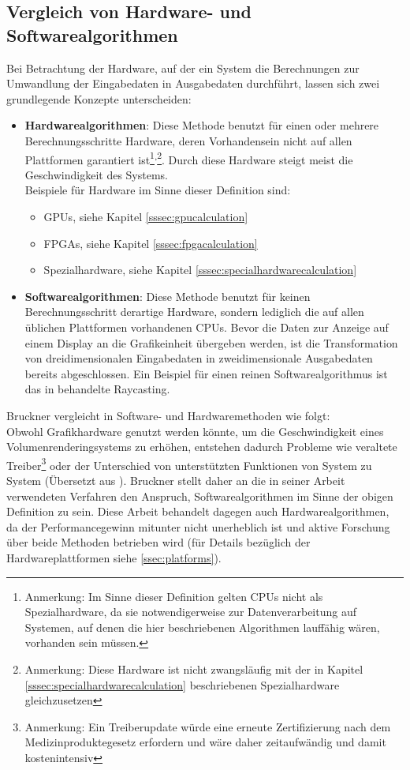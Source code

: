 \documentclass[ngerman,pdftex,paper=A4,DIV=calc,titlepage,12pt]{scrartcl}
\newtheorem[L]{boxedDefinition}{Definition}
\begin{document}
\subsection{Vergleich von Hardware- und Softwarealgorithmen}\label{ssec:swhwcomparison}
Bei Betrachtung der Hardware, auf der ein System die Berechnungen zur Umwandlung der Eingabedaten in Ausgabedaten durchführt, lassen sich zwei grundlegende Konzepte unterscheiden:
\begin{itemize}
 \item \textbf{Hardwarealgorithmen}: Diese Methode benutzt für einen oder mehrere Berechnungsschritte Hardware, deren Vorhandensein nicht auf allen Plattformen garantiert ist\footnote{Anmerkung: Im Sinne dieser Definition gelten CPUs nicht als Spezialhardware, da sie notwendigerweise zur Datenverarbeitung auf Systemen, auf denen die hier beschriebenen Algorithmen lauffähig  wären, vorhanden sein müssen.}\textsuperscript{,}\footnote{Anmerkung: Diese Hardware ist nicht zwangsläufig mit der in Kapitel \ref{sssec:specialhardwarecalculation} beschriebenen Spezialhardware gleichzusetzen}. Durch diese Hardware steigt meist die Geschwindigkeit des Systems.\\
 Beispiele für Hardware im Sinne dieser Definition sind:
 \begin{itemize}
  \item GPUs, siehe Kapitel \vref{sssec:gpucalculation} 
  \item FPGAs, siehe Kapitel \vref{sssec:fpgacalculation}
  \item Spezialhardware, siehe Kapitel \vref{sssec:specialhardwarecalculation}
 \end{itemize}
 \item \textbf{Softwarealgorithmen}: Diese Methode benutzt für keinen Berechnungsschritt derartige Hardware, sondern lediglich die auf allen üblichen Plattformen vorhandenen CPUs. Bevor die Daten zur Anzeige auf einem Display an die Grafikeinheit übergeben werden, ist die Transformation von dreidimensionalen Eingabedaten in zweidimensionale Ausgabedaten bereits abgeschlossen. Ein Beispiel für einen reinen Softwarealgorithmus ist das in \cite{Bruckner2004} behandelte Raycasting.	
\end{itemize}

Bruckner vergleicht in \cite{Bruckner2004} Software- und Hardwaremethoden wie folgt:\\
Obwohl Grafikhardware genutzt werden könnte, um die Geschwindigkeit eines Volumenrenderingsystems zu erhöhen, entstehen dadurch Probleme wie veraltete Treiber\footnote{Anmerkung: Ein Treiberupdate würde eine erneute Zertifizierung nach dem Medizinproduktegesetz erfordern und wäre daher zeitaufwändig und damit kostenintensiv} oder der Unterschied von unterstützten Funktionen von System zu System (Übersetzt aus \cite[Kapitel 3.1.1, Seite 17, Paragraph \glqq Pure Software \grqq]{Bruckner2004}).
Bruckner stellt daher an die in seiner Arbeit verwendeten Verfahren den Anspruch, Softwarealgorithmen im Sinne der obigen Definition zu sein.
Diese Arbeit behandelt dagegen auch Hardwarealgorithmen, da der Performancegewinn mitunter nicht unerheblich ist und aktive Forschung über beide Methoden betrieben wird (für Details bezüglich der Hardwareplattformen siehe \vref{ssec:platforms}).
\end{document}

